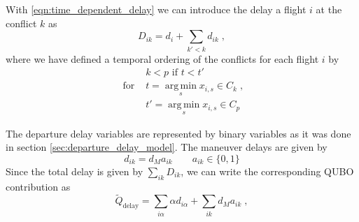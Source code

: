 \documentclass[aps,pra,twocolumn,10pt]{revtex4-1}
\begin{document}
With \eqref{eqn:time_dependent_delay} we can introduce the delay a flight $i$ at the conflict $k$ as
\begin{equation} \label{eqn:maneuver_model_delay_at_conflict}
    D_{ik} = d_i + \sum_{k'<k} d_{ik} \; ,
\end{equation}
where we have defined a temporal ordering of the conflicts for each flight $i$ by
\begin{align*}
                 &k < p \text{ if } t < t' \\
    \text{ for } &t = \operatorname*{arg\, min}_s x_{i, s} \in C_k \; , \\
                 &t' = \operatorname*{arg\, min}_s x_{i, s} \in C_p
\end{align*}

The departure delay variables are represented by binary variables as it was done in section \ref{sec:departure_delay_model}.
The maneuver delays are given by
\begin{equation*}
    d_{ik} = d_M a_{ik} \qquad a_{ik} \in \{0, 1\}
\end{equation*}
Since the total delay is given by $\sum_{ik} D_{ik}$, we can write the corresponding QUBO contribution as
\begin{equation*}
    \tilde Q_\text{delay} = \sum_{i\alpha} \alpha d_{i\alpha}  + \sum_{ik} d_M a_{ik}\; ,
\end{equation*}
\end{document}
